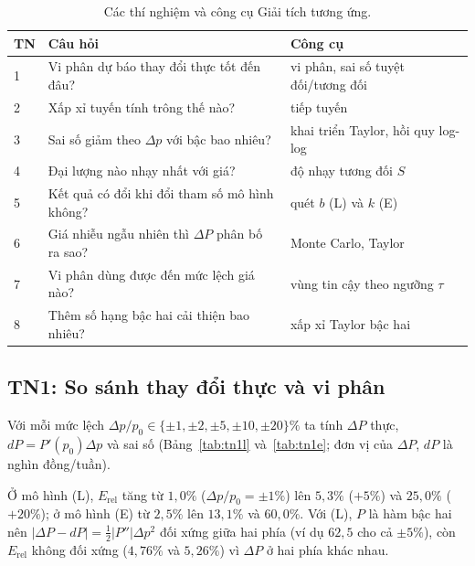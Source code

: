 \begin{table}[ht]
\tbsty
\caption{Các thí nghiệm và công cụ Giải tích tương ứng.}\label{tab:tn}
\begin{tabular}{@{}l p{6.2cm} p{6.2cm}@{}}
\toprule
TN & Câu hỏi & Công cụ \\
\midrule
1 & Vi phân dự báo thay đổi thực tốt đến đâu? & vi phân, sai số tuyệt đối/tương đối \\
2 & Xấp xỉ tuyến tính trông thế nào? & tiếp tuyến \\
3 & Sai số giảm theo $\Delta p$ với bậc bao nhiêu? & khai triển Taylor, hồi quy log-log \\
4 & Đại lượng nào nhạy nhất với giá? & độ nhạy tương đối $S$ \\
5 & Kết quả có đổi khi đổi tham số mô hình không? & quét $b$ (L) và $k$ (E) \\
6 & Giá nhiễu ngẫu nhiên thì $\Delta P$ phân bố ra sao? & Monte Carlo, Taylor \\
7 & Vi phân dùng được đến mức lệch giá nào? & vùng tin cậy theo ngưỡng $\tau$ \\
8 & Thêm số hạng bậc hai cải thiện bao nhiêu? & xấp xỉ Taylor bậc hai \\
\bottomrule
\end{tabular}
\end{table}

\subsection{TN1: So sánh thay đổi thực và vi phân}
Với mỗi mức lệch $\Delta p/p_0\in\{\pm1,\pm2,\pm5,\pm10,\pm20\}\%$ ta tính $\Delta P$ thực,
$dP=P'(p_0)\Delta p$ và sai số (Bảng~\ref{tab:tn1l} và~\ref{tab:tn1e}; đơn vị của $\Delta P$,
$dP$ là nghìn đồng/tuần).

\begin{table}[ht]
\tbsty
\caption{Lợi nhuận $P$ tại $p_0=50$, mô hình (L).}\label{tab:tn1l}

\end{table}

\begin{table}[ht]
\tbsty
\caption{Lợi nhuận $P$ tại $p_0=40$, mô hình (E).}\label{tab:tn1e}

\end{table}

Ở mô hình (L), $E_{\mathrm{rel}}$ tăng từ $1{,}0\%$ ($\Delta p/p_0=\pm1\%$) lên $5{,}3\%$
($+5\%$) và $25{,}0\%$ ($+20\%$); ở mô hình (E) từ $2{,}5\%$ lên $13{,}1\%$ và $60{,}0\%$. Với
(L), $P$ là hàm bậc hai nên $|\Delta P-dP|=\tfrac12|P''|\Delta p^2$ đối xứng giữa hai phía
(ví dụ $62{,}5$ cho cả $\pm5\%$), còn $E_{\mathrm{rel}}$ không đối xứng ($4{,}76\%$ và $5{,}26\%$)
vì $\Delta P$ ở hai phía khác nhau.

